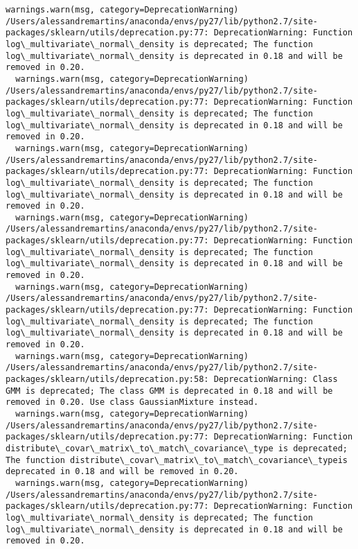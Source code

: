 \documentclass[11pt]{article}
\begin{document}
\begin{Verbatim}[commandchars=\\\{\}]
  warnings.warn(msg, category=DeprecationWarning)
/Users/alessandremartins/anaconda/envs/py27/lib/python2.7/site-packages/sklearn/utils/deprecation.py:77: DeprecationWarning: Function log\_multivariate\_normal\_density is deprecated; The function log\_multivariate\_normal\_density is deprecated in 0.18 and will be removed in 0.20.
  warnings.warn(msg, category=DeprecationWarning)
/Users/alessandremartins/anaconda/envs/py27/lib/python2.7/site-packages/sklearn/utils/deprecation.py:77: DeprecationWarning: Function log\_multivariate\_normal\_density is deprecated; The function log\_multivariate\_normal\_density is deprecated in 0.18 and will be removed in 0.20.
  warnings.warn(msg, category=DeprecationWarning)
/Users/alessandremartins/anaconda/envs/py27/lib/python2.7/site-packages/sklearn/utils/deprecation.py:77: DeprecationWarning: Function log\_multivariate\_normal\_density is deprecated; The function log\_multivariate\_normal\_density is deprecated in 0.18 and will be removed in 0.20.
  warnings.warn(msg, category=DeprecationWarning)
/Users/alessandremartins/anaconda/envs/py27/lib/python2.7/site-packages/sklearn/utils/deprecation.py:77: DeprecationWarning: Function log\_multivariate\_normal\_density is deprecated; The function log\_multivariate\_normal\_density is deprecated in 0.18 and will be removed in 0.20.
  warnings.warn(msg, category=DeprecationWarning)
/Users/alessandremartins/anaconda/envs/py27/lib/python2.7/site-packages/sklearn/utils/deprecation.py:77: DeprecationWarning: Function log\_multivariate\_normal\_density is deprecated; The function log\_multivariate\_normal\_density is deprecated in 0.18 and will be removed in 0.20.
  warnings.warn(msg, category=DeprecationWarning)
/Users/alessandremartins/anaconda/envs/py27/lib/python2.7/site-packages/sklearn/utils/deprecation.py:58: DeprecationWarning: Class GMM is deprecated; The class GMM is deprecated in 0.18 and will be  removed in 0.20. Use class GaussianMixture instead.
  warnings.warn(msg, category=DeprecationWarning)
/Users/alessandremartins/anaconda/envs/py27/lib/python2.7/site-packages/sklearn/utils/deprecation.py:77: DeprecationWarning: Function distribute\_covar\_matrix\_to\_match\_covariance\_type is deprecated; The function distribute\_covar\_matrix\_to\_match\_covariance\_typeis deprecated in 0.18 and will be removed in 0.20.
  warnings.warn(msg, category=DeprecationWarning)
/Users/alessandremartins/anaconda/envs/py27/lib/python2.7/site-packages/sklearn/utils/deprecation.py:77: DeprecationWarning: Function log\_multivariate\_normal\_density is deprecated; The function log\_multivariate\_normal\_density is deprecated in 0.18 and will be removed in 0.20.

\end{Verbatim}
\end{document}
